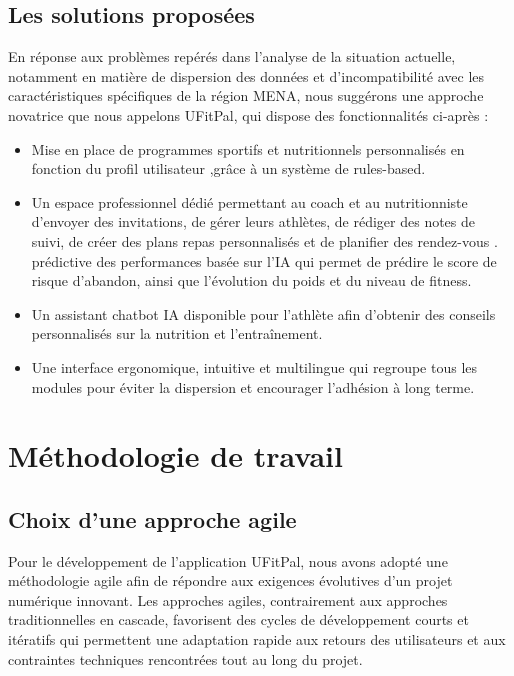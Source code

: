 ﻿\documentclass[a4paper,12pt]{report}
\begin{document}
\subsection{Les solutions proposées}
En réponse aux problèmes repérés dans l'analyse de la situation actuelle, notamment en matière de dispersion des données et d'incompatibilité avec les caractéristiques spécifiques de la région MENA, nous suggérons une approche novatrice que nous appelons UFitPal, qui dispose des fonctionnalités ci-après :

\begin{itemize}
\item  Mise en place de programmes sportifs et nutritionnels personnalisés en fonction du profil utilisateur ,grâce à un système de rules-based.

\item  Un espace professionnel dédié permettant au coach et au nutritionniste d'envoyer des invitations, de gérer leurs athlètes, 
de rédiger des notes de suivi, de créer des plans repas personnalisés et de planifier des rendez-vous .
 prédictive des performances basée sur l'IA qui permet de prédire le score de risque d'abandon, ainsi que l'évolution du poids et du niveau de fitness. 
\item Un assistant chatbot IA disponible pour l'athlète afin d'obtenir des conseils personnalisés sur la nutrition et l'entraînement.
 \item Une interface ergonomique, intuitive et multilingue qui regroupe tous les modules pour éviter la dispersion et encourager l'adhésion à long terme.
\end{itemize}

\section{Méthodologie de travail}

\subsection{Choix d'une approche agile}
Pour le développement de l'application UFitPal, nous avons adopté une méthodologie agile afin de répondre aux exigences évolutives d'un projet numérique innovant. Les approches agiles, contrairement 
 aux approches traditionnelles en cascade, favorisent des cycles de développement courts et itératifs 
 qui permettent une adaptation rapide aux retours des utilisateurs et aux contraintes techniques rencontrées tout au long du projet.
\end{document}
